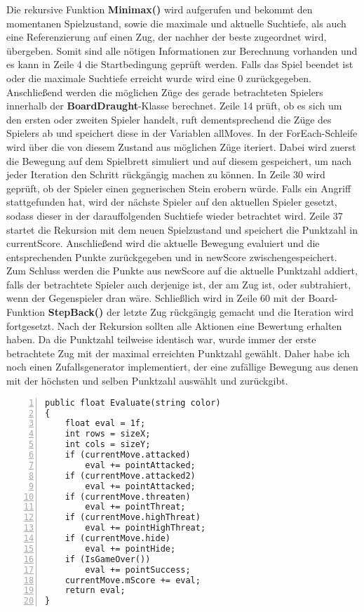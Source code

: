 Die rekursive Funktion \textbf{Minimax()} wird aufgerufen und bekommt den momentanen Spielzustand, sowie die maximale und aktuelle Suchtiefe, als auch eine Referenzierung auf einen Zug, der nachher der beste zugeordnet wird, übergeben. Somit sind alle nötigen Informationen zur Berechnung vorhanden und es kann in Zeile 4 die Startbedingung geprüft werden. Falls das Spiel beendet ist oder die maximale Suchtiefe erreicht wurde wird eine 0 zurückgegeben. Anschließend werden die möglichen Züge des gerade betrachteten Spielers innerhalb der \textbf{BoardDraught}-Klasse berechnet. Zeile 14 prüft, ob es sich um den ersten oder zweiten Spieler handelt, ruft dementsprechend die Züge des Spielers ab und speichert diese in der Variablen allMoves. In der ForEach-Schleife wird über die von diesem Zustand aus möglichen Züge iteriert. Dabei wird zuerst die Bewegung auf dem Spielbrett simuliert und auf diesem gespeichert, um nach jeder Iteration den Schritt rückgängig machen zu können. In Zeile 30 wird geprüft, ob der Spieler einen gegnerischen Stein erobern würde. Falls ein Angriff stattgefunden hat, wird der nächste Spieler auf den aktuellen Spieler gesetzt, sodass dieser in der darauffolgenden Suchtiefe wieder betrachtet wird. Zeile 37 startet die Rekursion mit dem neuen Spielzustand und speichert die Punktzahl in currentScore. Anschließend wird die aktuelle Bewegung evaluiert und die entsprechenden Punkte zurückgegeben und in newScore zwischengespeichert. Zum Schluss werden die Punkte aus newScore auf die aktuelle Punktzahl addiert, falls der betrachtete Spieler auch derjenige ist, der am Zug ist, oder subtrahiert, wenn der Gegenspieler dran wäre. Schließlich wird in Zeile 60 mit der Board-Funktion \textbf{StepBack()} der letzte Zug rückgängig gemacht und die Iteration wird fortgesetzt. Nach der Rekursion sollten alle Aktionen eine Bewertung erhalten haben. Da die Punktzahl teilweise identisch war, wurde immer der erste betrachtete Zug mit der maximal erreichten Punktzahl gewählt. Daher habe ich noch einen Zufallsgenerator implementiert, der eine zufällige Bewegung aus denen mit der höchsten und selben Punktzahl auswählt und zurückgibt.\\
\begin{lstlisting}[basicstyle=\scriptsize\ttfamily, numbers=left, stepnumber=1, numberstyle = \tiny]
public float Evaluate(string color)
{
	float eval = 1f;
	int rows = sizeX;
	int cols = sizeY;
	if (currentMove.attacked)
		eval += pointAttacked;
	if (currentMove.attacked2)
		eval += pointAttacked;
	if (currentMove.threaten)
		eval += pointThreat;
	if (currentMove.highThreat)
		eval += pointHighThreat;
	if (currentMove.hide)
		eval += pointHide;
	if (IsGameOver())
		eval += pointSuccess;
	currentMove.mScore += eval;
	return eval;
}
\end{lstlisting}

